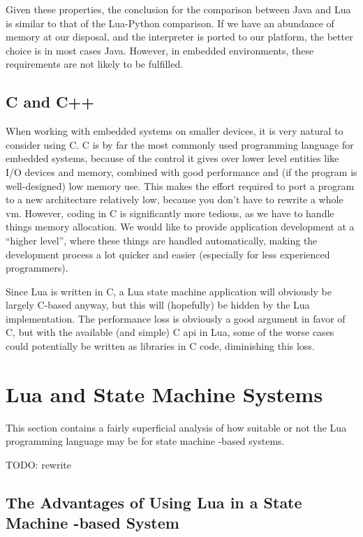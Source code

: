 Given these properties, the conclusion for the comparison between Java and Lua is similar to that of the Lua-Python comparison. If we have an abundance of memory at our disposal, and the interpreter is ported to our platform, the better choice is in most cases Java. However, in embedded environments, these requirements are not likely to be fulfilled.

\subsection{C and C++}
\label{sec:lua_vs_c}
When working with embedded systems on smaller devices, it is very natural to consider using C. C is by far the most commonly used programming language for embedded systems, because of the control it gives over lower level entities like I/O devices and memory, combined with good performance and (if the program is well-designed) low memory use. This makes the effort required to port a program to a new architecture relatively low, because you don't have to rewrite a whole \gls{vm}. However, coding in C is significantly more tedious, as we have to handle things memory allocation. We would like to provide application development at a ``higher level'', where these things are handled automatically, making the development process a lot quicker and easier (especially for less experienced programmers).

Since Lua is written in C, a Lua state machine application will obviously be largely C-based anyway, but this will (hopefully) be hidden by the Lua implementation. The performance loss is obviously a good argument in favor of C, but with the available (and simple) C \gls{api} in Lua, some of the worse cases could potentially be written as libraries in C code, diminishing this loss.

\section{Lua and State Machine Systems}
\label{sec:lua_and_state_machines}
This section contains a fairly superficial analysis of how suitable or not the Lua programming language may be for state machine -based systems.

TODO: rewrite

\subsection{The Advantages of Using Lua in a State Machine -based System}
\label{sec:lua_advantages}

